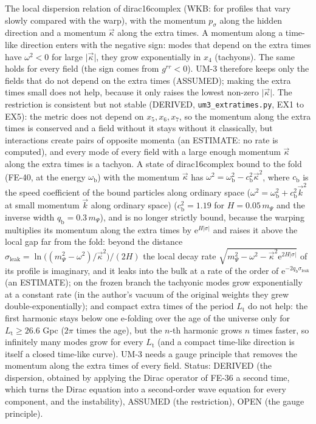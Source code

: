 \documentclass[
  10pt,
]{article}
\begin{document}
The local dispersion relation of dirac16complex (WKB: for profiles that
vary slowly compared with the warp), with the momentum \(p_\sigma\)
along the hidden direction and a momentum \(\vec\kappa\) along the extra
times. A momentum along a time-like direction enters with the negative
sign: modes that depend on the extra times have \(\omega^2 < 0\) for
large \(\lvert\vec\kappa\rvert\), they grow exponentially in \(x_4\)
(tachyons). The same holds for every field (the sign comes from
\(g^{rr} < 0\)). UM-3 therefore keeps only the fields that do not depend
on the extra times (ASSUMED); making the extra times small does not
help, because it only raises the lowest non-zero
\(\lvert\vec\kappa\rvert\). The restriction is consistent but not stable
(DERIVED, \texttt{um3\_extratimes.py}, EX1 to EX5): the metric does not
depend on \(x_5, x_6, x_7\), so the momentum along the extra times is
conserved and a field without it stays without it classically, but
interactions create pairs of opposite momenta (an ESTIMATE: no rate is
computed), and every mode of every field with a large enough momentum
\(\vec\kappa\) along the extra times is a tachyon. A state of
dirac16complex bound to the fold (FE-40, at the energy
\(\omega_{\mathrm{b}}\)) with the momentum \(\vec\kappa\) has
\(\omega^2 = \omega_{\mathrm{b}}^2 - c_{\mathrm{b}}^2\vec\kappa^2\),
where \(c_{\mathrm{b}}\) is the speed coefficient of the bound particles
along ordinary space
(\(\omega^2 = \omega_{\mathrm{b}}^2 + c_{\mathrm{b}}^2\vec k^2\) at
small momentum \(\vec k\) along ordinary space)
(\(c_{\mathrm{b}}^2 = 1.19\) for \(H = 0.05\,m_\Psi\) and the inverse
width \(q_{\mathrm{b}} = 0.3\,m_\Psi\)), and is no longer strictly
bound, because the warping multiplies its momentum along the extra times
by \(\mathrm{e}^{H\lvert\sigma\rvert}\) and raises it above the local
gap far from the fold: beyond the distance
\(\sigma_{\mathrm{leak}} = \ln\big((m_\Psi^2 - \omega^2)/\vec\kappa^2\big)/(2H)\)
the local decay rate
\(\sqrt{m_\Psi^2 - \omega^2 - \vec\kappa^2\mathrm{e}^{2H\lvert\sigma\rvert}}\)
of its profile is imaginary, and it leaks into the bulk at a rate of the
order of \(\mathrm{e}^{-2q_{\mathrm{b}}\sigma_{\mathrm{leak}}}\) (an
ESTIMATE); on the frozen branch the tachyonic modes grow exponentially
at a constant rate (in the author's vacuum of the original weights they
grew double-exponentially); and compact extra times of the period
\(L_{\mathrm{t}}\) do not help: the first harmonic stays below one
e-folding over the age of the universe only for
\(L_{\mathrm{t}} \ge 26.6\) Gpc (\(2\pi\) times the age), but the
\(n\)-th harmonic grows \(n\) times faster, so infinitely many modes
grow for every \(L_{\mathrm{t}}\) (and a compact time-like direction is
itself a closed time-like curve). UM-3 needs a gauge principle that
removes the momentum along the extra times of every field. Status:
DERIVED (the dispersion, obtained by applying the Dirac operator of
FE-36 a second time, which turns the Dirac equation into a second-order
wave equation for every component, and the instability), ASSUMED (the
restriction), OPEN (the gauge principle).
\end{document}
